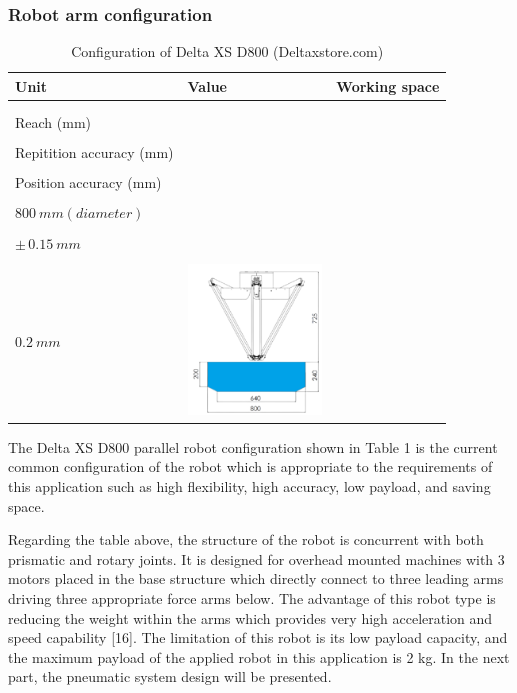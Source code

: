 \documentclass[10pt, letterpaper]{article}
\begin{document}
\subsubsection*{Robot arm configuration}
    \begin{table}[h!]
        \caption{Configuration of Delta XS D800 (Deltaxstore.com)}\label{table1}
        \centering
        \renewcommand{\arraystretch}{1.5}
        \begin{tabular}{l l l}
            \hline
            Unit & Value & Working space \\ \hline
            \begin{minipage}{4.3cm}
                Payload (kg) \\\\ Reach (mm) \\\\ Repitition accuracy (mm) \\\\ Position accuracy (mm)
            \end{minipage}
            &
            \begin{minipage}{3cm}
                $2\:kg$ \\\\ $800\:mm (diameter)$ \\\\ $\pm\,0.15\:mm$ \\\\ $0.2\:mm$
            \end{minipage}
            &
            \begin{minipage}{0.3\textwidth}
                \includegraphics[width=\linewidth, height=40mm]{DX.png}
            \end{minipage}
            \\ \hline
        \end{tabular}
    \end{table}
    The Delta XS D800 parallel robot configuration shown in Table 1 is the current common configuration of the robot which is appropriate to the requirements of this application such as high flexibility, high accuracy, low payload, and saving space.\par
    Regarding the table above, the structure of the robot is concurrent with both prismatic and rotary joints. It is designed for overhead mounted machines with 3 motors placed in the base structure which directly connect to three leading arms driving three appropriate force arms below. The advantage of this robot type is reducing the weight within the arms which provides very high acceleration and speed capability [16]. The limitation of this robot is its low payload capacity, and the maximum payload of the applied robot in this application is 2 kg. In the next part, the pneumatic system design will be presented.\par
\end{document}

